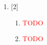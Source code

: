 \begin{enumerate}[label=(\roman*)]
    \item \hfill [2]
        \begin{enumerate}[label=(\alph*)]
            \item \textcolor{red}{TODO} 
            \item \textcolor{red}{TODO} 
        \end{enumerate}

\end{enumerate}

